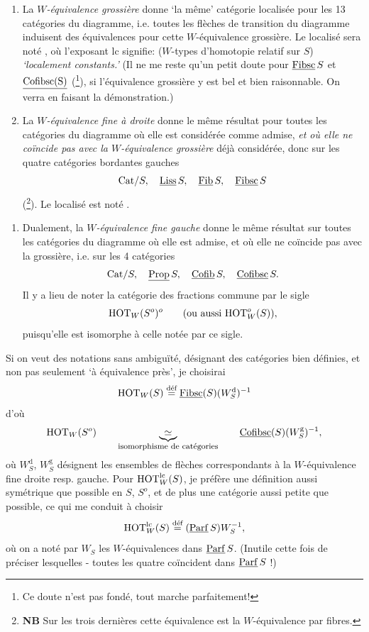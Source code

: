\begin{enumerate}[leftmargin=*]
\item[$1^o$)] La \textit{$W$-équivalence grossière} donne `la même' catégorie localisée pour les 13 catégories du diagramme, i.e. toutes les flèches de transition du diagramme induisent des équivalences pour cette $W$-équivalence grossière. Le localisé sera noté , où l'exposant lc signifie: ($W$-types d'homotopie relatif sur $S$) \textit{`localement constants.'} (Il ne me reste qu'un petit doute pour $\uc{Fibsc}\,S$ et $\uc{Cofibsc(S)}$ (\footnote[34]{Ce doute n'est pas fondé, tout marche parfaitement!}), si l'équivalence grossière y est bel et bien raisonnable. On verra en faisant la démonstration.)

\item[$2^o$)] La \textit{$W$-équivalence fine à droite} donne le même résultat pour toutes les catégories du diagramme où elle est considérée comme admise, \textit{et où elle ne coïncide pas avec la $W$-équivalence grossière} déjà considérée, donc sur les quatre catégories bordantes gauches
\[
\Cat/S,\quad \uc{Liss}\,S,\quad \uc{Fib}\,S,\quad \uc{Fibsc}\,S
\]
(\footnote[35]{\textbf{NB} Sur les trois dernières cette équivalence est la $W$-équivalence par fibres.}). Le localisé est noté .
\end{enumerate}



\begin{enumerate}[leftmargin=*]
\item[$2'^o$)] Dualement, la \textit{$W$-équivalence fine gauche} donne le même résultat sur toutes les catégories du diagramme où elle est admise, et où elle ne coïncide pas avec la grossière, i.e. sur les 4 catégories
\[
\Cat/S,\quad \uc{Prop}\,S,\quad \uc{Cofib}\,S,\quad \uc{Cofibsc}\,S.
\]
Il y a lieu de noter la catégorie des fractions commune par le sigle
\[
\HOT_W(S^o)^o \qquad \text{(ou aussi $\HOT^o_W(S)$)},
\]
puisqu'elle est isomorphe à celle notée par ce sigle.
\end{enumerate}

Si on veut des notations sans ambiguïté, désignant des catégories bien définies, et non pas seulement `à équivalence près', je choisirai
\[
\HOT_W(S) \defeq \uc{Fibsc}(S)(W^{\mathrm{d}}_S)^{-1}
\]
d'où
\[
\HOT_W(S^o) \qquad \underbrace{\simeq}_{\text{\footnotesize isomorphisme de catégories}} \qquad \uc{Cofibsc}(S)(W^{\mathrm{g}}_S)^{-1},
\]
où $W^{\mathrm{d}}_S$, $W^{\mathrm{g}}_S$ désignent les ensembles de flèches correspondants à la $W$-équivalence fine droite resp. gauche. Pour $\HOT^{\mathrm{lc}}_W(S)$, je préfère une définition aussi symétrique que possible en $S$, $S^o$, et de plus une catégorie aussi petite que possible, ce qui me conduit à choisir
\[
\HOT^{\mathrm{lc}}_W(S) \defeq (\uc{Parf}\,S)W^{-1}_S,
\]
où on a noté par $W_S$ les $W$-équivalences dans $\uc{Parf}\,S$. (Inutile cette fois de préciser lesquelles - toutes les quatre coïncident dans $\uc{Parf}\,S$ !)


